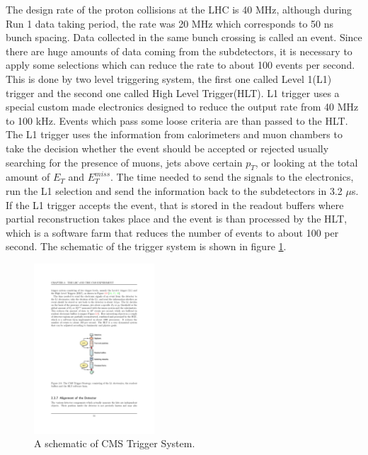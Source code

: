 The design rate of the proton collisions at the LHC is 40 MHz, although during Run 1 data taking period, the rate was 20 MHz which corresponds to 50 ns bunch spacing. Data collected in the same bunch crossing is called an event. Since there are huge amounts of data coming from the subdetectors, it is necessary to apply some selections which can reduce the rate to about 100 events per second. This is done by two level triggering system, the first one called Level 1(L1) trigger and the second one called High Level Trigger(HLT). L1 trigger uses a special custom made electronics designed to reduce the output rate from 40 MHz to 100 kHz. Events which pass some loose criteria are than passed to the HLT. The L1 trigger uses the information from calorimeters and muon chambers to take the decision whether the event should be accepted or rejected usually searching for the presence of muons, jets above certain $p_T$, or looking at the total amount of $E_T$ and $E_T^{miss}$. The time needed to send the signals to the electronics, run the L1 selection and send the information back to the subdetectors in 3.2 $\mu$s. If the L1 trigger accepts the event, that is stored in the readout buffers where partial reconstruction takes place and the event is than processed by the HLT, which is a software farm that reduces the number of events to about 100 per second. The schematic of the trigger system is shown in figure \ref{fig:trigger}.
\begin{figure}[htbp]
	\centering
		\includegraphics[width=0.4\textwidth]{Figures/trigger.pdf}
	\caption[A drawing of CMS Trigger System.]{A schematic of CMS Trigger System. \cite{Chatrchyan:2008aa}}
	\label{fig:trigger}
\end{figure}


